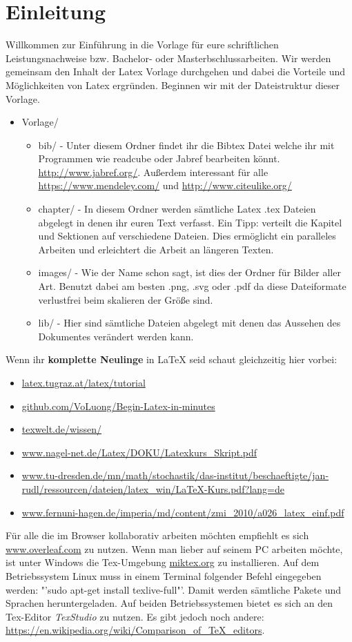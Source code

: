\chapter{Einleitung}
\label{Einleitung}
Willkommen zur Einführung in die Vorlage für eure schriftlichen Leistungsnachweise bzw. Bachelor- oder Masterbschlussarbeiten. Wir werden gemeinsam den Inhalt der Latex Vorlage durchgehen und dabei die Vorteile und Möglichkeiten von Latex ergründen. Beginnen wir mit der Dateistruktur dieser Vorlage.

\begin{itemize}
	\item Vorlage/
		\begin{itemize}
			\item bib/ - Unter diesem Ordner findet ihr die Bibtex Datei welche ihr mit Programmen wie readcube oder Jabref bearbeiten könnt. \url{http://www.jabref.org/}. Außerdem interessant für alle \url{https://www.mendeley.com/} und \url{http://www.citeulike.org/}
			\item chapter/ - In diesem Ordner werden sämtliche Latex .tex Dateien abgelegt in denen ihr euren Text verfasst. Ein Tipp: verteilt die Kapitel und Sektionen auf verschiedene Dateien. Dies ermöglicht ein paralleles Arbeiten und erleichtert die Arbeit an längeren Texten.
			\item images/ - Wie der Name schon sagt, ist dies der Ordner für Bilder aller Art. Benutzt dabei am besten .png, .svg oder .pdf da diese Dateiformate verlustfrei beim skalieren der Größe sind.
			\item lib/ - Hier sind sämtliche Dateien abgelegt mit denen das Aussehen des Dokumentes verändert werden kann. 
		\end{itemize}
\end{itemize}

Wenn ihr \textbf{komplette Neulinge} in LaTeX seid schaut gleichzeitig hier vorbei:
\begin{itemize}
	\item \url{latex.tugraz.at/latex/tutorial}
	\item \url{github.com/VoLuong/Begin-Latex-in-minutes}
	\item \url{texwelt.de/wissen/}
	\item \url{www.nagel-net.de/Latex/DOKU/Latexkurs_Skript.pdf}
	\item \url{www.tu-dresden.de/mn/math/stochastik/das-institut/beschaeftigte/jan-rudl/ressourcen/dateien/latex_win/LaTeX-Kurs.pdf?lang=de}
	\item \url{www.fernuni-hagen.de/imperia/md/content/zmi_2010/a026_latex_einf.pdf}
\end{itemize} 
Für alle die im Browser kollaborativ arbeiten möchten empfiehlt es sich \url{www.overleaf.com} zu nutzen. Wenn man lieber auf seinem PC arbeiten möchte, ist unter Windows die Tex-Umgebung \url{miktex.org} zu installieren. Auf dem Betriebssystem Linux muss in einem Terminal folgender Befehl eingegeben werden: "'sudo apt-get install texlive-full"'. Damit werden sämtliche Pakete und Sprachen heruntergeladen. Auf beiden Betriebssystemen bietet es sich an den Tex-Editor \emph{TexStudio} zu nutzen. Es gibt jedoch noch andere: \url{https://en.wikipedia.org/wiki/Comparison_of_TeX_editors}.

